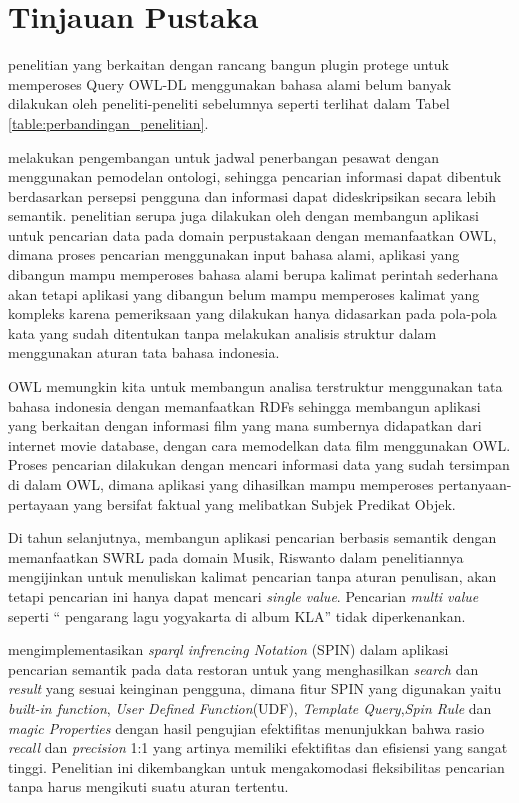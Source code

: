 \section{Tinjauan Pustaka}
penelitian yang berkaitan dengan rancang bangun plugin protege untuk memperoses Query OWL-DL menggunakan bahasa alami belum banyak dilakukan oleh peneliti-peneliti sebelumnya seperti terlihat dalam Tabel \ref{table:perbandingan_penelitian}.

\citet{azhari_sholichah}melakukan pengembangan untuk jadwal penerbangan pesawat dengan menggunakan pemodelan ontologi, sehingga pencarian informasi dapat dibentuk berdasarkan persepsi pengguna dan informasi dapat dideskripsikan secara lebih semantik. penelitian serupa juga dilakukan oleh \citet{andri} dengan membangun aplikasi untuk pencarian data pada domain perpustakaan dengan memanfaatkan OWL, dimana proses pencarian menggunakan input bahasa alami, aplikasi yang dibangun mampu memperoses bahasa alami berupa kalimat perintah sederhana akan tetapi aplikasi yang dibangun belum mampu memperoses kalimat yang kompleks karena pemeriksaan yang dilakukan hanya didasarkan pada pola-pola kata yang sudah ditentukan tanpa melakukan analisis struktur dalam menggunakan aturan tata bahasa indonesia.

OWL memungkin kita untuk membangun analisa terstruktur menggunakan tata bahasa indonesia dengan memanfaatkan RDFs sehingga \citet{bendi} membangun aplikasi yang berkaitan dengan informasi film yang mana sumbernya didapatkan dari internet movie database, dengan cara memodelkan data film menggunakan OWL. Proses pencarian dilakukan dengan mencari informasi data yang sudah tersimpan di dalam OWL, dimana aplikasi yang dihasilkan mampu memperoses pertanyaan-pertayaan yang bersifat faktual yang melibatkan Subjek Predikat Objek.

Di tahun selanjutnya, \citet{riswanto} membangun aplikasi pencarian berbasis semantik dengan memanfaatkan SWRL pada domain Musik, Riswanto dalam penelitiannya mengijinkan untuk menuliskan kalimat pencarian tanpa aturan penulisan, akan tetapi pencarian ini hanya dapat mencari \emph{single value}. Pencarian \emph{multi value} seperti “ pengarang lagu yogyakarta di album KLA” tidak diperkenankan.

\citet{haryawan} mengimplementasikan \emph{sparql infrencing Notation} (SPIN) dalam aplikasi pencarian semantik pada data restoran untuk yang menghasilkan \emph{search} dan  \emph{result} yang sesuai keinginan pengguna, dimana fitur SPIN yang digunakan yaitu \emph{built-in function}, \emph{User Defined Function}(UDF), \emph{Template Query},\emph{Spin Rule} dan \emph{magic Properties} dengan hasil pengujian efektifitas menunjukkan bahwa rasio \emph{recall} dan \emph{precision} 1:1 yang artinya memiliki efektifitas dan efisiensi yang sangat tinggi. Penelitian ini dikembangkan untuk mengakomodasi fleksibilitas pencarian tanpa harus mengikuti suatu aturan tertentu.

